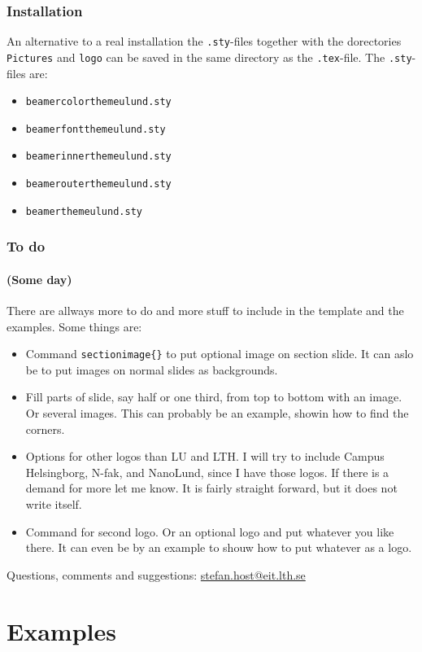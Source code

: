 \documentclass[aspectratio=1610]{beamer}
\def\txtbs{\symbol{92}}
\begin{document}
\begin{frame}%
  \frametitle{Installation}
  An alternative to a real installation the \texttt{.sty}-files together with the dorectories \texttt{Pictures} and \texttt{logo} can be saved in the same directory as the \texttt{.tex}-file. The \texttt{.sty}-files are:
  \begin{itemize}
  \item \texttt{beamercolorthemeulund.sty}
  \item \texttt{beamerfontthemeulund.sty}
  \item \texttt{beamerinnerthemeulund.sty}
  \item \texttt{beamerouterthemeulund.sty}
  \item \texttt{beamerthemeulund.sty}
  \end{itemize}
\end{frame}
  

\begin{frame}%
  \frametitle{To do}
  \framesubtitle{(Some day)}
  There are allways more to do and more stuff to include in the template and the examples. Some things are: 
  \begin{itemize}
  \item Command \texttt{\txtbs sectionimage\{\}} to put optional image on section slide. It can aslo be to put images on normal slides as backgrounds. 
  \item Fill parts of slide, say half or one third, from top to bottom with an image. Or several images. This can probably be an example, showin how to find the corners. 
  \item Options for other logos than LU and LTH. I will try to include Campus Helsingborg, N-fak, and NanoLund, since I have those logos. If there is a demand for more let me know. It is fairly straight forward, but it does not write itself.
  \item Command for second logo. Or an optional logo and put whatever you like there. It can even be by an example to shouw how to put whatever as a logo.
  \end{itemize}
  Questions, comments and suggestions: \href{mailto:stefan.host@eit.lth.se}{stefan.host@eit.lth.se}
\end{frame}

\section{Examples}
\end{document}
